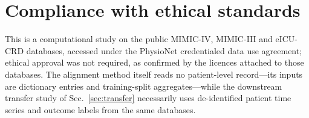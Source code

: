\documentclass{article}
\begin{document}
\section{Compliance with ethical standards}
This is a computational study on the public MIMIC-IV, MIMIC-III and eICU-CRD databases,
accessed under the PhysioNet credentialed data use agreement; ethical approval was not
required, as confirmed by the licences attached to those databases. The alignment method
itself reads no patient-level record---its inputs are dictionary entries and
training-split aggregates---while the downstream transfer study of
Sec.~\ref{sec:transfer} necessarily uses de-identified patient time series and outcome
labels from the same databases.



\end{document}

